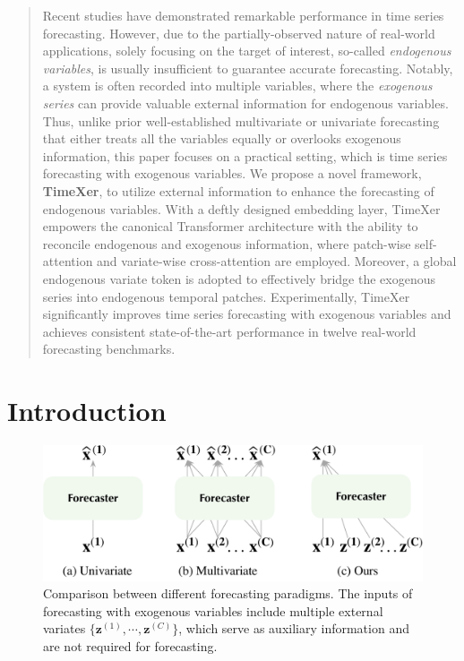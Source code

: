 \documentclass[nohyperref]{article}
\theoremstyle{plain}
\theoremstyle{definition}
\theoremstyle{remark}
\begin{document}
\printAffiliationsAndNotice{\icmlEqualContribution} %

\begin{abstract}
Recent studies have demonstrated remarkable performance in time series forecasting. However, due to the partially-observed nature of real-world applications, solely focusing on the target of interest, so-called \emph{endogenous variables}, is usually insufficient to guarantee accurate forecasting. Notably, a system is often recorded into multiple variables, where the \emph{exogenous series} can provide valuable external information for endogenous variables. Thus, unlike prior well-established multivariate or univariate forecasting that either treats all the variables equally or overlooks exogenous information, this paper focuses on a practical setting, which is time series forecasting with exogenous variables. We propose a novel framework, \textbf{TimeXer}, to utilize external information to enhance the forecasting of endogenous variables. With a deftly designed embedding layer, TimeXer empowers the canonical Transformer architecture with the ability to reconcile endogenous and exogenous information, where patch-wise self-attention and variate-wise cross-attention are employed. Moreover, a global endogenous variate token is adopted to effectively bridge the exogenous series into endogenous temporal patches. Experimentally, TimeXer significantly improves time series forecasting with exogenous variables and achieves consistent state-of-the-art performance in twelve real-world forecasting benchmarks.
\end{abstract}

\section{Introduction}

\begin{figure}[t]
    \centering
    \includegraphics[width=\linewidth]{fig/Backgroundv4.pdf}
    \vspace{-20pt}
    \caption{Comparison between different forecasting paradigms. The inputs of forecasting with exogenous variables include multiple external variates $\{\mathbf{z}^{(1)},\cdots,\mathbf{z}^{(C)}\}$, which serve as auxiliary information and are not required for forecasting. }
    \label{fig:Compare-Forecasting}
    \vspace{-15pt}
\end{figure}
\end{document}
